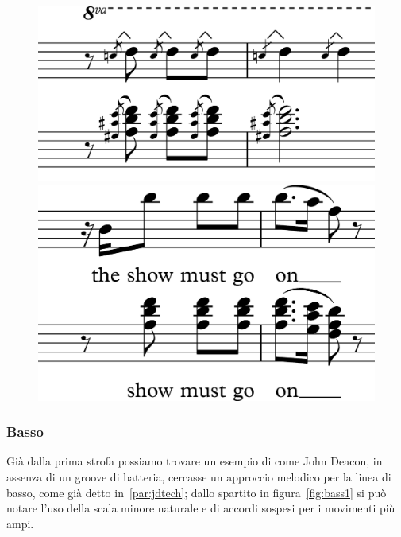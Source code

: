 \documentclass[12pt]{article}
\begin{document}
\begin{figure}[H]
 \begin{minipage}{0.4\textwidth}
  \centering
  \includegraphics[width=\textwidth,keepaspectratio]{guitars/guitChoir}
 \end{minipage}
 \hfill
 \begin{minipage}{0.4\textwidth}
  \centering
  \includegraphics[width=\textwidth,keepaspectratio]{guitars/ch_guit}
 \end{minipage}
\end{figure}

\subsubsection{Basso}
Già dalla prima strofa possiamo trovare un esempio di come John Deacon, in assenza di un groove di batteria, cercasse un approccio melodico per la linea di basso, come già detto in~\ref{par:jdtech}; dallo spartito in figura~\ref{fig:bass1} si può notare l'uso della scala minore naturale e di accordi sospesi per i movimenti più ampi.
\end{document}
